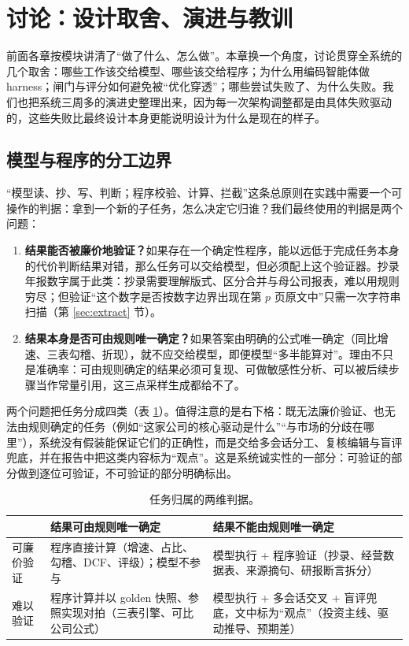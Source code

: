 \section{讨论：设计取舍、演进与教训}
\label{sec:discussion}

前面各章按模块讲清了“做了什么、怎么做”。本章换一个角度，讨论贯穿全系统的几个取舍：哪些工作该交给模型、哪些该交给程序；为什么用编码智能体做 harness；闸门与评分如何避免被“优化穿透”；哪些尝试失败了、为什么失败。我们也把系统三周多的演进史整理出来，因为每一次架构调整都是由具体失败驱动的，这些失败比最终设计本身更能说明设计为什么是现在的样子。

\subsection{模型与程序的分工边界}
\label{sec:disc-boundary}

“模型读、抄、写、判断；程序校验、计算、拦截”这条总原则在实践中需要一个可操作的判据：拿到一个新的子任务，怎么决定它归谁？我们最终使用的判据是两个问题：

\begin{enumerate}
  \item \textbf{结果能否被廉价地验证？}如果存在一个确定性程序，能以远低于完成任务本身的代价判断结果对错，那么任务可以交给模型，但必须配上这个验证器。抄录年报数字属于此类：抄录需要理解版式、区分合并与母公司报表，难以用规则穷尽；但验证“这个数字是否按数字边界出现在第 $p$ 页原文中”只需一次字符串扫描（第 \ref{sec:extract} 节）。
  \item \textbf{结果本身是否可由规则唯一确定？}如果答案由明确的公式唯一确定（同比增速、三表勾稽、折现），就不应交给模型，即便模型“多半能算对”。理由不只是准确率：可由规则确定的结果必须可复现、可做敏感性分析、可以被后续步骤当作常量引用，这三点采样生成都给不了。
\end{enumerate}

两个问题把任务分成四类（表 \ref{tab:disc-quadrant}）。值得注意的是右下格：既无法廉价验证、也无法由规则确定的任务（例如“这家公司的核心驱动是什么”“与市场的分歧在哪里”），系统没有假装能保证它们的正确性，而是交给多会话分工、复核编辑与盲评兜底，并在报告中把这类内容标为“观点”。这是系统诚实性的一部分：可验证的部分做到逐位可验证，不可验证的部分明确标出。

\begin{table}[h]
\centering
\caption{任务归属的两维判据。}
\label{tab:disc-quadrant}
\small
\begin{tabularx}{\linewidth}{@{}p{2.3cm}XX@{}}
\toprule
 & 结果可由规则唯一确定 & 结果不能由规则唯一确定 \\
\midrule
可廉价验证 & 程序直接计算（增速、占比、勾稽、DCF、评级）；模型不参与 & 模型执行 + 程序验证（抄录、经营数据表、来源摘句、研报断言拆分） \\
难以验证 & 程序计算并以 golden 快照、参照实现对拍（三表引擎、可比公司公式） & 模型执行 + 多会话交叉 + 盲评兜底，文中标为“观点”（投资主线、驱动推导、预期差） \\
\bottomrule
\end{tabularx}
\end{table}

